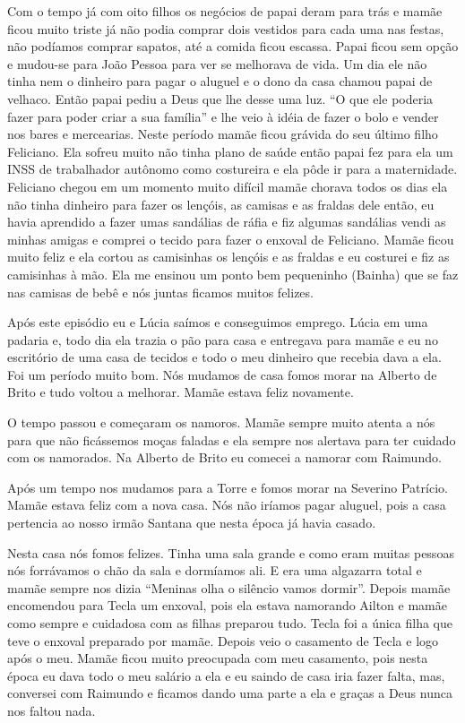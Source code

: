 \documentclass[
  brazil,
  a6paper,
  oneside,
  landscape,
  14pt]{scrbook}
\begin{document}
Com o tempo já com oito filhos os negócios de papai deram para trás e
mamãe ficou muito triste já não podia comprar dois vestidos para cada
uma nas festas, não podíamos comprar sapatos, até a comida ficou
escassa. Papai ficou sem opção e mudou-se para João Pessoa para ver se
melhorava de vida. Um dia ele não tinha nem o dinheiro para pagar o
aluguel e o dono da casa chamou papai de velhaco. Então papai pediu a
Deus que lhe desse uma luz. ``O que ele poderia fazer para poder criar a
sua família'' e lhe veio à idéia de fazer o bolo e vender nos bares e
mercearias. Neste período mamãe ficou grávida do seu último filho
Feliciano. Ela sofreu muito não tinha plano de saúde então papai fez
para ela um INSS de trabalhador autônomo como costureira e ela pôde ir
para a maternidade. Feliciano chegou em um momento muito difícil mamãe
chorava todos os dias ela não tinha dinheiro para fazer os lençóis, as
camisas e as fraldas dele então, eu havia aprendido a fazer umas
sandálias de ráfia e fiz algumas sandálias vendi as minhas amigas e
comprei o tecido para fazer o enxoval de Feliciano. Mamãe ficou muito
feliz e ela cortou as camisinhas os lençóis e as fraldas e eu costurei e
fiz as camisinhas à mão. Ela me ensinou um ponto bem pequeninho (Bainha)
que se faz nas camisas de bebê e nós juntas ficamos muitos felizes.

Após este episódio eu e Lúcia saímos e conseguimos emprego. Lúcia em uma
padaria e, todo dia ela trazia o pão para casa e entregava para mamãe e
eu no escritório de uma casa de tecidos e todo o meu dinheiro que
recebia dava a ela. Foi um período muito bom. Nós mudamos de casa fomos
morar na Alberto de Brito e tudo voltou a melhorar. Mamãe estava feliz
novamente.

O tempo passou e começaram os namoros. Mamãe sempre muito atenta a nós
para que não ficássemos moças faladas e ela sempre nos alertava para ter
cuidado com os namorados. Na Alberto de Brito eu comecei a namorar com
Raimundo.

Após um tempo nos mudamos para a Torre e fomos morar na Severino
Patrício. Mamãe estava feliz com a nova casa. Nós não iríamos pagar
aluguel, pois a casa pertencia ao nosso irmão Santana que nesta época já
havia casado.

Nesta casa nós fomos felizes. Tinha uma sala grande e como eram muitas
pessoas nós forrávamos o chão da sala e dormíamos ali. E era uma
algazarra total e mamãe sempre nos dizia ``Meninas olha o silêncio vamos
dormir''. Depois mamãe encomendou para Tecla um enxoval, pois ela estava
namorando Ailton e mamãe como sempre e cuidadosa com as filhas preparou
tudo. Tecla foi a única filha que teve o enxoval preparado por mamãe.
Depois veio o casamento de Tecla e logo após o meu. Mamãe ficou muito
preocupada com meu casamento, pois nesta época eu dava todo o meu
salário a ela e eu saindo de casa iria fazer falta, mas, conversei com
Raimundo e ficamos dando uma parte a ela e graças a Deus nunca nos
faltou nada.
\end{document}
